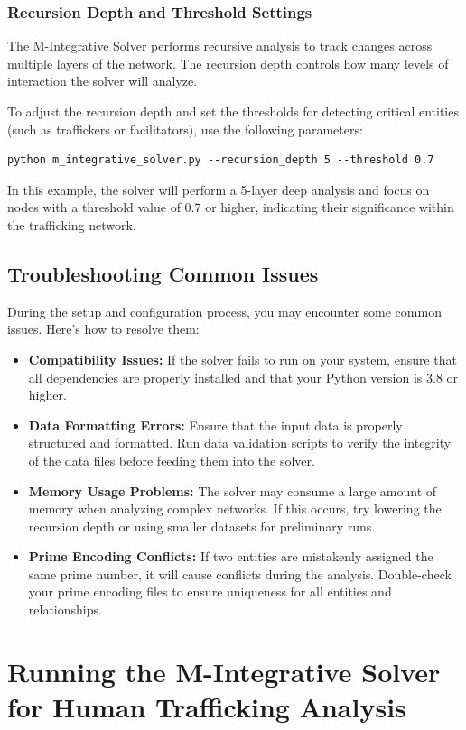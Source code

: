 \documentclass[%
 preprint, linenumbers,
 amsmath,amssymb,
 aps, physrev,
]{revtex4-2}
\begin{document}
\subsubsection{Recursion Depth and Threshold Settings}
The M-Integrative Solver performs recursive analysis to track changes across multiple layers of the network. The recursion depth controls how many levels of interaction the solver will analyze.

To adjust the recursion depth and set the thresholds for detecting critical entities (such as traffickers or facilitators), use the following parameters:
\begin{verbatim}
python m_integrative_solver.py --recursion_depth 5 --threshold 0.7
\end{verbatim}
In this example, the solver will perform a 5-layer deep analysis and focus on nodes with a threshold value of 0.7 or higher, indicating their significance within the trafficking network.

\subsection{Troubleshooting Common Issues}

During the setup and configuration process, you may encounter some common issues. Here’s how to resolve them:

\begin{itemize}
    \item \textbf{Compatibility Issues:} If the solver fails to run on your system, ensure that all dependencies are properly installed and that your Python version is 3.8 or higher.
    \item \textbf{Data Formatting Errors:} Ensure that the input data is properly structured and formatted. Run data validation scripts to verify the integrity of the data files before feeding them into the solver.
    \item \textbf{Memory Usage Problems:} The solver may consume a large amount of memory when analyzing complex networks. If this occurs, try lowering the recursion depth or using smaller datasets for preliminary runs.
    \item \textbf{Prime Encoding Conflicts:} If two entities are mistakenly assigned the same prime number, it will cause conflicts during the analysis. Double-check your prime encoding files to ensure uniqueness for all entities and relationships.
\end{itemize}

\section{Running the M-Integrative Solver for Human Trafficking Analysis}
\end{document}
